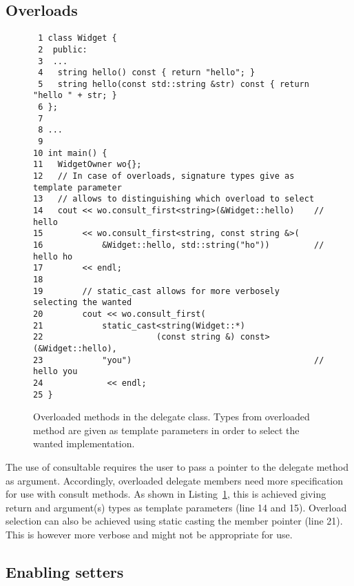 \documentclass{article}
\begin{document}
\subsection{Overloads}
\begin{figure}[ht]
{\small
\begin{lstlisting}
 1 class Widget {
 2  public:
 3  ...
 4   string hello() const { return "hello"; }
 5   string hello(const std::string &str) const { return "hello " + str; }
 6 };
 7 
 8 ...
 9 
10 int main() {
11   WidgetOwner wo{};
12   // In case of overloads, signature types give as template parameter
13   // allows to distinguishing which overload to select
14   cout << wo.consult_first<string>(&Widget::hello)    // hello
15        << wo.consult_first<string, const string &>(
16            &Widget::hello, std::string("ho"))         // hello ho
17        << endl;
18        
19        // static_cast allows for more verbosely selecting the wanted
20        cout << wo.consult_first(
21            static_cast<string(Widget::*)
22                       (const string &) const>(&Widget::hello),
23            "you")                                     // hello you
24             << endl;
25 }
\end{lstlisting}}
\cprotect\caption{Overloaded methods in the delegate class. Types from overloaded method are given as template parameters in order to select the wanted implementation.}
\label{example:overload}
\end{figure}

The use of consultable requires the user to pass a pointer to the delegate method as argument. Accordingly, overloaded delegate members need more specification for use with consult methods. As shown in Listing~\ref{example:overload}, this is achieved giving return and argument(s) types as template parameters (line 14 and 15). Overload selection can also be achieved using static casting the member pointer (line 21). This is however more verbose and might not be appropriate for use.  

\subsection{Enabling setters}
\end{document}
